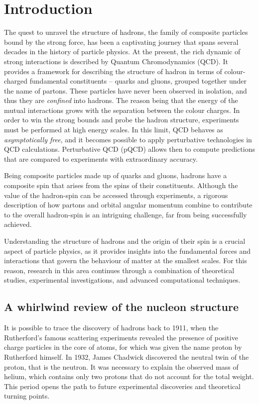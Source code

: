 \chapter{Introduction}
\label{ch:1}

The quest to unravel the structure of hadrons, the family of composite particles bound by the strong force, has been a captivating journey that spans several decades in the history of particle physics. At the present, the rich dynamic of strong interactions is described by Quantum Chromodynamics (QCD). It provides a framework for describing the structure of hadron in terms of colour-charged fundamental constituents -- quarks and gluons, grouped together under the name of partons. These particles have never been observed in isolation, and thus they are \textit{confined} into hadrons. The reason being that the energy of the mutual interactions grows with the separation between the colour charges. In order to win the strong bounds and probe the hadron structure, experiments must be performed at high energy scales. In this limit, QCD  behaves as \textit{asymptotically free}, and it becomes possible to apply perturbative technologies in QCD calculations. Perturbative QCD (pQCD) allows then to compute predictions that are compared to experiments with extraordinary accuracy.%

Being composite particles made up of quarks and gluons, hadrons have a composite spin that arises from the spins of their constituents. Although the value of the hadron-spin can be accessed through experiments, a rigorous description of how partons and orbital angular momentum combine to contribute to the overall hadron-spin is an intriguing challenge, far from being successfully achieved.%

Understanding the structure of hadrons and the origin of their spin is a crucial aspect of particle physics, as it provides insights into the fundamental forces and interactions that govern the behaviour of matter at the smallest scales. For this reason, research in this area continues through a combination of theoretical studies, experimental investigations, and advanced computational techniques. 


\section{A whirlwind review of the nucleon structure}

It is possible to trace the discovery of hadrons back to 1911, when the Rutherford's famous scattering experiments revealed the presence of positive charge particles in the core of atoms, for which was given the name proton by Rutherford himself. In 1932, James Chadwick discovered the neutral twin of the proton, that is the neutron. It was necessary to explain the observed mass of helium, which contains only two protons that do not account for the total weight. This period opens the path to future experimental discoveries and theoretical turning points.%

